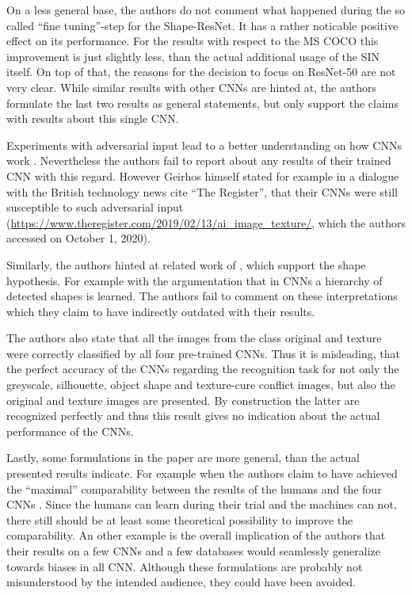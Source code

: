 \documentclass[runningheads,a4paper]{llncs}
\begin{document}
On a less general base, the authors do not comment what happened during the so called ``fine tuning''-step for the Shape-ResNet. It has a rather noticable positive effect on its performance. For the results with respect to the MS COCO this improvement is just slightly less, than the actual additional usage of the SIN itself.
On top of that, the reasons for the decision to focus on ResNet-50 are not very clear. While similar results with other CNNs are hinted at, the authors formulate the last two results as general statements, but only support the claims with results about this single CNN.

Experiments with adversarial input lead to a better understanding on how CNNs work \citep{zeiler2014visualizing}. Nevertheless the authors fail to report about any results of their trained CNN with this regard. However Geirhos himself stated for example in a dialogue with the British technology news cite ``The Register'', that their CNNs were still susceptible to such adversarial input (\url{https://www.theregister.com/2019/02/13/ai_image_texture/}, which the authors accessed on October 1, 2020).

Similarly, the authors hinted at related work of \citet{zeiler2014visualizing}, which support the shape hypothesis. For example with the argumentation that in CNNs a hierarchy of detected shapes is learned. The authors fail to comment on these interpretations which they claim to have indirectly outdated with their results.

The authors also state that all the images from the class original and texture were correctly classified by all four pre-trained CNNs. Thus it is misleading, that the perfect accuracy of the CNNs regarding the recognition task for not only the greyscale, silhouette, object shape and texture-cure conflict images, but also the original and texture images are presented. By construction the latter are recognized perfectly and thus this result gives no indication about the actual performance of the CNNs.

Lastly, some formulations in the paper are more general, than the actual presented results indicate. For example when the authors claim to have achieved the ``maximal'' comparability between the results of the humans and the four CNNs \citep{geirhos2018imagenet}. Since the humans can learn during their trial and the machines can not, there still should be at least some theoretical possibility to improve the comparability. An other example is the overall implication of the authors that their results on a few CNNs and a few databases would seamlessly generalize towards biases in all CNN. Although these formulations are probably not misunderstood by the intended audience, they could have been avoided.
\end{document}
